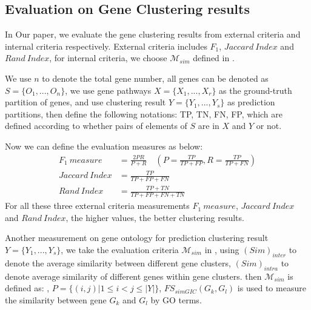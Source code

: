 \documentclass{bmcart}
\begin{document}
\subsection*{\textbf{Evaluation on Gene Clustering results}}
In Our paper, we evaluate the gene clustering results from external criteria and internal criteria respectively. External criteria includes $F_1$, $Jaccard\ Index$ and $Rand\ Index$, for internal criteria, we choose $\mathcal{M}_{sim}$ defined in \cite{Bordino2010}.

 We use $n$ to denote the total gene number, all genes can be denoted as $S=\{O_1,...,O_n\}$, we use gene pathways $X=\{X_1,...,X_r\}$ as the ground-truth partition of genes, and use clustering result $Y=\{Y_1,...,Y_s\}$ as prediction partitions, then define the following notations: TP, TN, FN, FP, which are defined according to whether pairs of elements of $S$ are in $X$ and $Y$ or not.

Now we can define the evaluation measures as below:
\begin{equation}\label{}\nonumber
\begin{split}
F_{1}\ measure&=\frac{2PR}{P+R}\quad(P=\frac{TP}{TP+FP},  R=\frac{TP}{TP+FN}) \\
Jaccard\ Index&=\frac{TP}{TP+FP+FN}\\
Rand\ Index&=\frac{TP+TN}{TP+FP+FN+TN}
\end{split}
\end{equation}
For all these three external criteria measurements $F_1\ measure$, $Jaccard\ Index$ and $Rand\ Index$, the higher values, the better clustering results.

Another measurement on gene ontology for prediction clustering result $Y=\{Y_1,...,Y_s\}$, we take the evaluation criteria $\mathcal{M}_{sim}$ in \cite{Bordino2010}, using  $(Sim)_{inter}$ to denote the average similarity between different gene clusters, $(Sim)_{intra}$ to denote average similarity of different genes within gene clusters. then $\mathcal{M}_{sim}$ is defined as:
,
$P=\{(i,j)|1\leq i< j\leq|Y|\}$, $FS_{simGIC}(G_k,G_l)$ \cite{Teng2013} is used to measure the similarity between gene $G_k$ and $G_l$ by GO terms.
\end{document}
